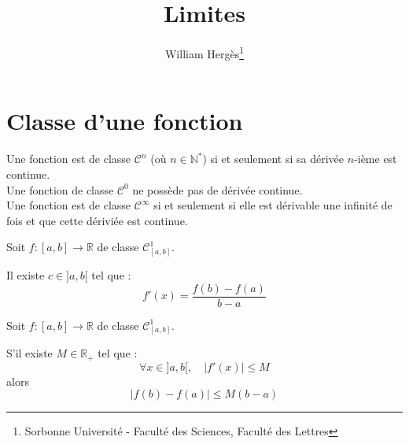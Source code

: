 \documentclass[a4paper, titlepage]{article}
\title{Limites}
\author{William Hergès\thanks{Sorbonne Université - Faculté des Sciences, Faculté des Lettres}}
\begin{document}
	\maketitle
	\tableofcontents
	\newpage
	\section{Classe d'une fonction}
	\begin{defn}
		Une fonction est de classe $\mathcal{C}^n$ (où $n\in\mathbb{N}^*$) si et seulement si sa dérivée $n$-ième est continue.\\
		Une fonction de classe $\mathcal{C}^0$ ne possède pas de dérivée continue.\\
		Une fonction est de classe $\mathcal{C}^{\infty}$ si et seulement si elle est dérivable une infinité de fois et que cette dériviée est continue.
	\end{defn}
	\begin{thm}
		Soit $f:[a,b]\to \mathbb{R}$ de classe $\mathcal{C}^1_{[a,b]}$.

		Il existe $c\in]a,b[$ tel que :
		$$ f'(x) = \frac{f(b)-f(a)}{b-a} $$
	\end{thm}
	\begin{thm}
		Soit $f:[a,b]\to \mathbb{R}$ de classe $\mathcal{C}^1_{[a,b]}$.

		S'il existe $M\in\mathbb{R}_+$ tel que :
		$$ \forall x\in]a,b[,\quad |f'(x)|\leqslant M $$
		alors
		$$ |f(b)-f(a)|\leqslant M(b-a) $$
	\end{thm}
\end{document}
